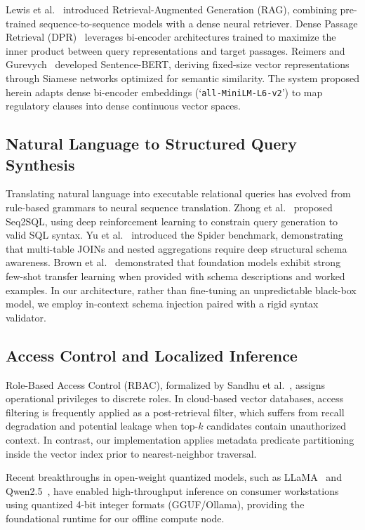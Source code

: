 \documentclass[conference]{IEEEtran}
\begin{document}
Lewis et al.~\cite{lewis2020retrieval} introduced Retrieval-Augmented Generation (RAG), combining pre-trained sequence-to-sequence models with a dense neural retriever. Dense Passage Retrieval (DPR)~\cite{karpukhin2020dense} leverages bi-encoder architectures trained to maximize the inner product between query representations and target passages. Reimers and Gurevych~\cite{reimers2019sentence} developed Sentence-BERT, deriving fixed-size vector representations through Siamese networks optimized for semantic similarity. The system proposed herein adapts dense bi-encoder embeddings (`\texttt{all-MiniLM-L6-v2}') to map regulatory clauses into dense continuous vector spaces.

\subsection{Natural Language to Structured Query Synthesis}
Translating natural language into executable relational queries has evolved from rule-based grammars to neural sequence translation. Zhong et al.~\cite{zhong2017seq2sql} proposed Seq2SQL, using deep reinforcement learning to constrain query generation to valid SQL syntax. Yu et al.~\cite{yu2018spider} introduced the Spider benchmark, demonstrating that multi-table JOINs and nested aggregations require deep structural schema awareness. Brown et al.~\cite{brown2020language} demonstrated that foundation models exhibit strong few-shot transfer learning when provided with schema descriptions and worked examples. In our architecture, rather than fine-tuning an unpredictable black-box model, we employ in-context schema injection paired with a rigid syntax validator.

\subsection{Access Control and Localized Inference}
Role-Based Access Control (RBAC), formalized by Sandhu et al.~\cite{sandhu1996role}, assigns operational privileges to discrete roles. In cloud-based vector databases, access filtering is frequently applied as a post-retrieval filter, which suffers from recall degradation and potential leakage when top-$k$ candidates contain unauthorized context. In contrast, our implementation applies metadata predicate partitioning inside the vector index prior to nearest-neighbor traversal.

Recent breakthroughs in open-weight quantized models, such as LLaMA~\cite{touvron2023llama} and Qwen2.5~\cite{qwen2024technical}, have enabled high-throughput inference on consumer workstations using quantized 4-bit integer formats (GGUF/Ollama), providing the foundational runtime for our offline compute node.
\end{document}
